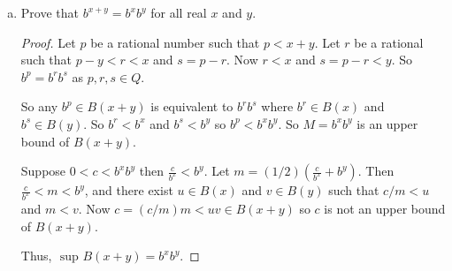 \begin{prblm}
\begin{enumerate}[(a)]
       \item Prove that $b^{x+y} = b^{x} b^{y}$ for all real $x$ and $y$.
       
       \begin{proof}
            Let $p$ be a rational number such that $p < x + y$. Let $r$ be a rational such that $p - y < r < x$ and $s = p - r$.
            Now $r < x$ and $s = p - r < y$. So $b^p = b^r b^s$ as $p, r, s \in Q$. 

            So any $b^p \in B(x + y)$ is equivalent to $b^r b^s$ where $b^r \in B(x)$ and $b^s \in B(y)$.
            So $b^r < b^x$ and $b^s < b^y$ so $b^p < b^x b^y$.
            So $M = b^x b^y$ is an upper bound of $B(x + y)$.
            
            Suppose $0 < c < b^x b^y$ then $\frac{c}{b^x} < b^y$.
            Let $m = (1/2)(\frac{c}{b^x} + b^y)$. Then $\frac{c}{b^x} < m < b^y$, 
            and there exist $u \in B(x)$ and $v \in B(y)$ such that $c / m < u$ and $m  < v$.
            Now $c = (c/m)m < uv \in B(x + y)$ so $c$ is not an upper bound of $B(x + y)$.

            Thus, $\text{ sup } B(x+y) = b^x b^y$.
       \end{proof}
    \end{enumerate}
\end{prblm}

